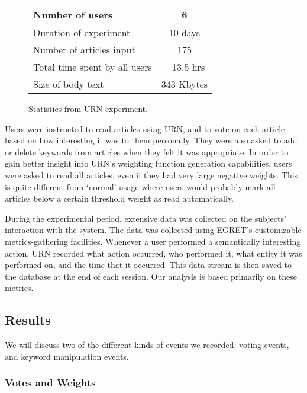 \begin{figure}[htb]
  \begin{center}
  \small
  \begin{tabular} {|l|c|} \hline
    Number of users & 6 \\ \hline
    Duration of experiment & 10 days \\ \hline
    Number of articles input & 175 \\ \hline
    Total time spent by all users & ~ 13.5 hrs \\ \hline
    Size of body text & 343 Kbytes \\ \hline
  \end{tabular}
  \caption{Statistics from URN experiment.}
  \label{tab:general-stat}
  \normalsize
  \end{center}
\end{figure}

Users were instructed to read articles using URN, and to vote on each article
based on how interesting it was to them personally. They were also asked to add
or delete keywords from articles when they felt it was appropriate. In order to
gain better insight into URN's weighting function generation capabilities,
users were asked to read all articles, even if they had very large negative
weights. This is quite different from `normal' usage where users
would probably mark all articles below a certain threshold weight as read
automatically.

During the experimental period, extensive data was collected on the
subjects' interaction with the system. The data was collected using EGRET's
customizable metrics-gathering facilities. Whenever a user performed a
semantically interesting action, URN recorded what action occurred, who
performed it, what entity it was performed on, and the time that it
occurred. This data stream is then saved to the database at the end of each
session. Our analysis is based primarily on these metrics.

\subsection{Results}

We will discuss two of the different kinds of events we recorded: voting
events, and keyword manipulation events.

\subsubsection{Votes and Weights}

